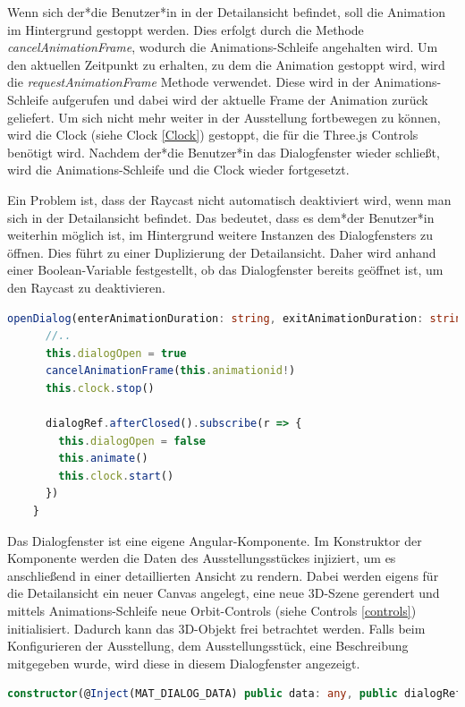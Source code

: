 Wenn sich der*die Benutzer*in in der Detailansicht befindet, soll die Animation im Hintergrund gestoppt werden. Dies erfolgt durch die Methode \emph{cancelAnimationFrame}, wodurch die Animations-Schleife angehalten wird. Um den aktuellen Zeitpunkt zu erhalten, zu dem die Animation gestoppt wird, wird die \emph{requestAnimationFrame} Methode verwendet. Diese wird in der Animations-Schleife aufgerufen und dabei wird der aktuelle Frame der Animation zurück geliefert. Um sich nicht mehr weiter in der Ausstellung fortbewegen zu können, wird die Clock (siehe Clock \ref{Clock}) gestoppt, die für die Three.js Controls benötigt wird. Nachdem der*die Benutzer*in das Dialogfenster wieder schließt, wird die Animations-Schleife und die Clock wieder fortgesetzt. 

Ein Problem ist, dass der Raycast nicht automatisch deaktiviert wird, wenn man sich in der Detailansicht befindet. Das bedeutet, dass es dem*der Benutzer*in weiterhin möglich ist, im Hintergrund weitere Instanzen des Dialogfensters zu öffnen. Dies führt zu einer Duplizierung der Detailansicht. Daher wird anhand einer Boolean-Variable festgestellt, ob das Dialogfenster bereits geöffnet ist, um den Raycast zu deaktivieren. 

\begin{lstlisting}[caption={Öffnen und Schließen des Dialogfensters},language=TypeScript]
  openDialog(enterAnimationDuration: string, exitAnimationDuration: string): void {
      //..
      this.dialogOpen = true
      cancelAnimationFrame(this.animationid!)
      this.clock.stop()
  
      dialogRef.afterClosed().subscribe(r => {
        this.dialogOpen = false
        this.animate()
        this.clock.start()
      })
    }
\end{lstlisting}

Das Dialogfenster ist eine eigene Angular-Komponente. Im Konstruktor der Komponente werden die Daten des Ausstellungsstückes injiziert, um es anschließend in einer detaillierten Ansicht zu rendern. Dabei werden eigens für die Detailansicht ein neuer Canvas angelegt, eine neue 3D-Szene gerendert und mittels Animations-Schleife neue Orbit-Controls (siehe Controls \ref{controls}) initialisiert. Dadurch kann das 3D-Objekt frei betrachtet werden. Falls beim Konfigurieren der Ausstellung, dem Ausstellungsstück, eine Beschreibung mitgegeben wurde, wird diese in diesem Dialogfenster angezeigt.

  \begin{lstlisting}[caption={Constructor-Injection in der Dialog Komponente},language=TypeScript]
    constructor(@Inject(MAT_DIALOG_DATA) public data: any, public dialogRef: MatDialogRef<ExhibitDialog>) {}

  \end{lstlisting}

